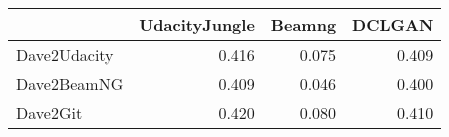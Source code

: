 \begin{tabular}{lrrr}
\toprule
{} &  UdacityJungle &  Beamng &  DCLGAN \\
\midrule
Dave2Udacity &          0.416 &   0.075 &   0.409 \\
Dave2BeamNG  &          0.409 &   0.046 &   0.400 \\
Dave2Git     &          0.420 &   0.080 &   0.410 \\
\bottomrule
\end{tabular}
